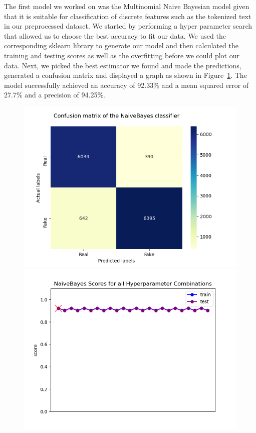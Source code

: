 \documentclass[10pt,twocolumn,letterpaper]{article}
\begin{document}
The first model we worked on was the Multinomial Naive Bayesian model given that it is suitable for classification of discrete features such as the tokenized text in our preprocessed dataset. We started by performing a hyper parameter search that allowed us to choose the best accuracy to fit our data. We used the corresponding sklearn library to generate our model and then calculated the training and testing scores as well as the overfitting before we could plot our data. Next, we picked the best estimator we found and made the predictions, generated a confusion matrix and displayed a graph as shown in Figure~\ref{first_figure}. The model successfully achieved an accuracy of 92.33\% and a mean squared error of 27.7\% and a precision of 94.25\%. 

\begin{figure}[h]
   \begin{center}
        \includegraphics[width=\linewidth]{Latex_Report/report/Graphs/NB/confusion_matrix.png}
        \includegraphics[width=\linewidth]{Latex_Report/report/Graphs/NB/scores_plot_NB.png}
   \end{center}
        \vspace*{-8mm}
        \caption{\label{first_figure}}
\end{figure}
\end{document}

